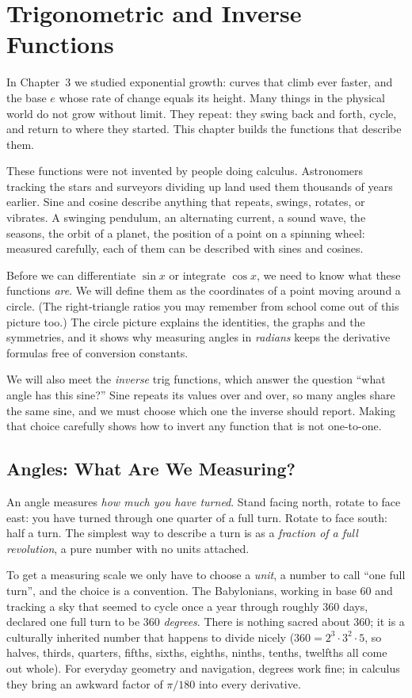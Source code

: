 \chapter{Trigonometric and Inverse Functions}

In Chapter~3 we studied exponential growth: curves that climb ever faster, and the
base $e$ whose rate of change equals its height. Many things in the physical world
do not grow without limit. They repeat: they swing back and forth, cycle, and
return to where they started. This chapter builds the functions that describe them.

These functions were not invented by people doing calculus. Astronomers tracking the stars and surveyors dividing up land used them thousands of years earlier. Sine and cosine describe anything that repeats, swings, rotates, or vibrates. A swinging pendulum, an alternating current, a sound wave, the seasons, the orbit of a planet, the position of a point on a spinning wheel: measured carefully, each of them can be described with sines and cosines.

Before we can differentiate $\sin x$ or integrate $\cos x$, we need to know what these functions \emph{are}. We will define them as the coordinates of a point moving around a circle. (The right-triangle ratios you may remember from school come out of this picture too.) The circle picture explains the identities, the graphs and the symmetries, and it shows why measuring angles in \emph{radians} keeps the derivative formulas free of conversion constants.

We will also meet the \emph{inverse} trig functions, which answer the question ``what angle has this sine?'' Sine repeats its values over and over, so many angles share the same sine, and we must choose which one the inverse should report. Making that choice carefully shows how to invert any function that is not one-to-one.

\section{Angles: What Are We Measuring?}
\label{ch04:angles}

An angle measures \emph{how much you have turned}. Stand facing north, rotate to face east: you have turned through one quarter of a full turn. Rotate to face south: half a turn. The simplest way to describe a turn is as a \emph{fraction of a full revolution}, a pure number with no units attached.

To get a measuring scale we only have to choose a \emph{unit}, a number to call ``one full turn'', and the choice is a convention. The Babylonians, working in base 60 and tracking a sky that seemed to cycle once a year through roughly 360 days, declared one full turn to be $360$ \emph{degrees}. There is nothing sacred about $360$; it is a culturally inherited number that happens to divide nicely ($360 = 2^3\cdot 3^2 \cdot 5$, so halves, thirds, quarters, fifths, sixths, eighths, ninths, tenths, twelfths all come out whole). For everyday geometry and navigation, degrees work fine; in calculus they bring an awkward factor of $\pi/180$ into every derivative.


